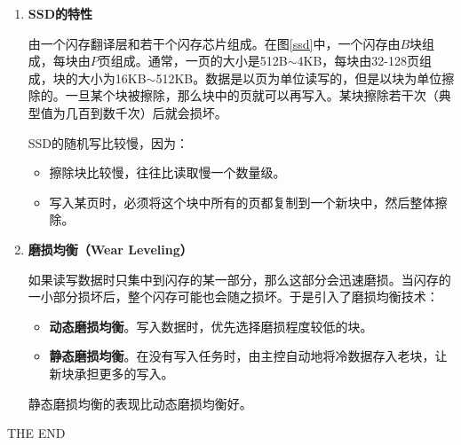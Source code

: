 \documentclass[12pt, a4paper, oneside]{ctexart}
\begin{document}
\begin{enumerate}
  \item {\bf SSD的特性}
  
  由一个闪存翻译层和若干个闪存芯片组成。在图\ref{ssd}中，一个闪存由$B$块组成，每块由$P$页组成。通常，一页的大小是512B$\sim$4KB，每块由32-128页组成，块的大小为16KB$\sim$512KB。数据是以页为单位读写的，但是以块为单位擦除的。一旦某个块被擦除，那么块中的页就可以再写入。某块擦除若干次（典型值为几百到数千次）后就会损坏。

  SSD的随机写比较慢，因为：
  \begin{itemize}
    \item 擦除块比较慢，往往比读取慢一个数量级。
    \item 写入某页时，必须将这个块中所有的页都复制到一个新块中，然后整体擦除。
  \end{itemize}

  \item {\bf 磨损均衡（Wear Leveling）}
  
  如果读写数据时只集中到闪存的某一部分，那么这部分会迅速磨损。当闪存的一小部分损坏后，整个闪存可能也会随之损坏。于是引入了磨损均衡技术：
  \begin{itemize}
    \item {\bf 动态磨损均衡}。写入数据时，优先选择磨损程度较低的块。
    \item {\bf 静态磨损均衡}。在没有写入任务时，由主控自动地将冷数据存入老块，让新块承担更多的写入。
  \end{itemize}

  静态磨损均衡的表现比动态磨损均衡好。
\end{enumerate}

\vspace*{30pt}

\begin{center}
  \Large{THE END}
\end{center}
\end{document}

